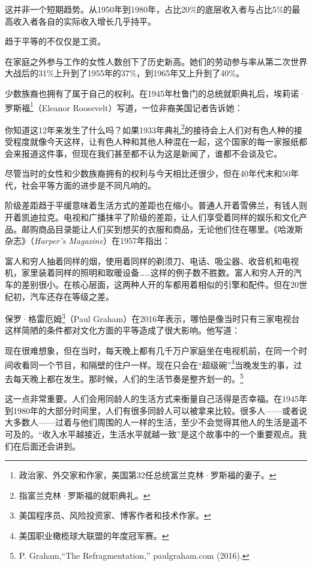 这并非一个短期趋势。从1950年到1980年，占比20\%的底层收入者与占比5\%的最高收入者各自的实际收入增长几乎持平。

趋于平等的不仅仅是工资。

在家庭之外参与工作的女性人数创下了历史新高。她们的劳动参与率从第二次世界大战后的31\%上升到了1955年的37\%，到1965年又上升到了40\%。

少数族裔也拥有了属于自己的权利。在1945年杜鲁门的总统就职典礼后，埃莉诺·罗斯福\footnote{政治家、外交家和作家，美国第32任总统富兰克林·罗斯福的妻子。}（Eleanor Roosevelt）写道，一位非裔美国记者告诉她：

{\kaishu

你知道这12年来发生了什么吗？如果1933年典礼\footnote{指富兰克林·罗斯福的就职典礼。}的接待会上人们对有色人种的接受程度就像今天这样，让有色人种和其他人种混在一起，这个国家的每一家报纸都会来报道这件事，但现在我们甚至都不认为这是新闻了，谁都不会谈及它。

}

尽管当时的女性和少数族裔拥有的权利与今天相比还很少，但在40年代末和50年代，社会平等方面的进步是不同凡响的。

阶级差距趋于平缓意味着生活方式的差距也在缩小。普通人开着雪佛兰，有钱人则开着凯迪拉克。电视和广播抹平了阶级的差距，让人们享受着同样的娱乐和文化产品。邮购商品目录能让人们买到想买的衣服和商品，无论他们住在哪里。《哈泼斯杂志》（\textit{Harper’s Magazine}）在1957年指出：

{\kaishu

富人和穷人抽着同样的烟，使用着同样的剃须刀、电话、吸尘器、收音机和电视机，家里装着同样的照明和取暖设备……这样的例子数不胜数。富人和穷人开的汽车的差别很小。在核心层面，这两种人开的车都用着相似的引擎和配件。但在20世纪初，汽车还存在等级之差。

}

保罗·格雷厄姆\footnote{美国程序员、风险投资家、博客作者和技术作家。}（Paul Graham）在2016年表示，哪怕是像当时只有三家电视台这样简陋的条件都对文化方面的平等造成了很大影响。他写道：

{\kaishu

现在很难想象，但在当时，每天晚上都有几千万户家庭坐在电视机前，在同一个时间收看同一个节目，和隔壁的住户一样。现在只会在“超级碗”\footnote{美国职业橄榄球大联盟的年度冠军赛。}当晚发生的事，过去每天晚上都在发生。那时候，人们的生活节奏是整齐划一的。\footnote{P. Graham,“The Refragmentation,” paulgraham.com (2016).}

}

这一点非常重要。人们会用同龄人的生活方式来衡量自己活得是否幸福。在1945年到1980年的大部分时间里，人们有很多同龄人可以被拿来比较。很多人——或者说大多数人——过着与他们周围的人一样的生活，至少不会觉得其他人的生活是遥不可及的。“收入水平越接近，生活水平就越一致”是这个故事中的一个重要观点。我们在后面还会讲到。

